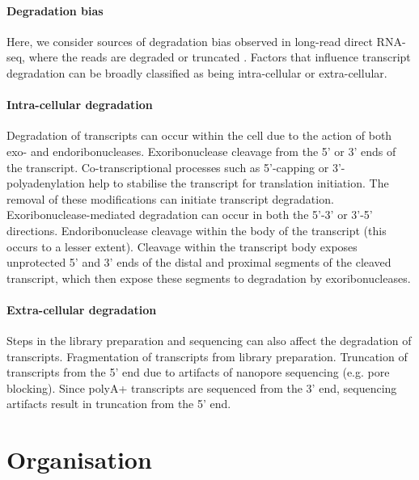 \paragraph{Degradation bias} Here, we consider sources of degradation bias observed in long-read direct RNA-seq, where the reads are degraded or truncated \cite{Soneson2019, Workman2019}. Factors that influence transcript degradation can be broadly classified as being intra-cellular or extra-cellular. 

\paragraph{Intra-cellular degradation} Degradation of transcripts can occur within the cell due to the action of both exo- and endoribonucleases. Exoribonuclease cleavage from the 5’ or 3’ ends of the transcript. Co-transcriptional processes such as 5’-capping or 3’-polyadenylation help to stabilise the transcript for translation initiation. The removal of these modifications can initiate transcript degradation. Exoribonuclease-mediated degradation can occur in both the 5’-3’ or 3’-5’ directions. Endoribonuclease cleavage within the body of the transcript (this occurs to a lesser extent). Cleavage within the transcript body exposes unprotected 5’ and 3’ ends of the distal and proximal segments of the cleaved transcript, which then expose these segments to degradation by exoribonucleases. 

\paragraph{Extra-cellular degradation} Steps in the library preparation and sequencing can also affect the degradation of transcripts. Fragmentation of transcripts from library preparation. Truncation of transcripts from the 5’ end due to artifacts of nanopore sequencing (e.g. pore blocking). Since polyA+ transcripts are sequenced from the 3’ end, sequencing artifacts result in truncation from the 5’ end.

\section{Organisation}

